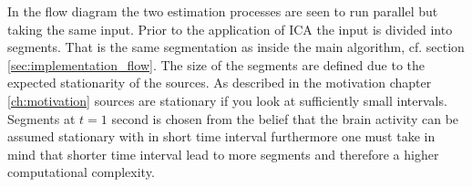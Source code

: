 In the flow diagram the two estimation processes are seen to run parallel but taking the same input. 
Prior to the application of ICA the input is divided into segments. That is the same segmentation as inside the main algorithm, cf. section \ref{sec:implementation_flow}.
The size of the segments are defined due to the expected stationarity of the sources. As described in the motivation chapter \ref{ch:motivation} sources are stationary if you look at sufficiently small intervals. 
Segments at $t = 1$ second is chosen from the belief that the brain activity can be assumed stationary with in short time interval furthermore one must take in mind that shorter time interval lead to more segments and therefore a higher computational complexity.   

